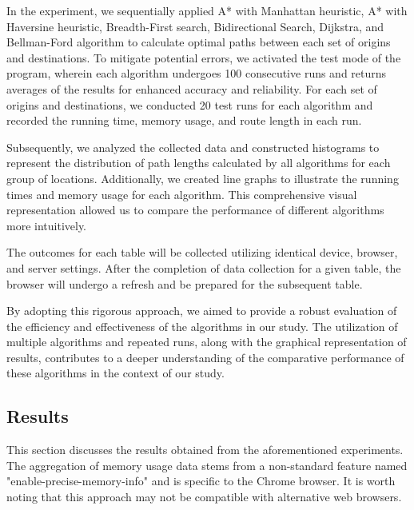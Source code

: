 \documentclass[12pt]{article}
\begin{document}
In the experiment, we sequentially applied A* with Manhattan heuristic, A* with Haversine heuristic, Breadth-First search, Bidirectional Search, Dijkstra, and Bellman-Ford algorithm to calculate optimal paths between each set of origins and destinations. To mitigate potential errors, we activated the test mode of the program, wherein each algorithm undergoes 100 consecutive runs and returns averages of the results for enhanced accuracy and reliability. For each set of origins and destinations, we conducted 20 test runs for each algorithm and recorded the running time, memory usage, and route length in each run.

Subsequently, we analyzed the collected data and constructed histograms to represent the distribution of path lengths calculated by all algorithms for each group of locations. Additionally, we created line graphs to illustrate the running times and memory usage for each algorithm. This comprehensive visual representation allowed us to compare the performance of different algorithms more intuitively.

The outcomes for each table will be collected utilizing identical device, browser, and server settings. After the completion of data collection for a given table, the browser will undergo a refresh and be prepared for the subsequent table.

By adopting this rigorous approach, we aimed to provide a robust evaluation of the efficiency and effectiveness of the algorithms in our study. The utilization of multiple algorithms and repeated runs, along with the graphical representation of results, contributes to a deeper understanding of the comparative performance of these algorithms in the context of our study.


\subsection{Results}

This section discusses the results obtained from the aforementioned experiments. The aggregation of memory usage data stems from a non-standard feature named "enable-precise-memory-info" and is specific to the Chrome browser. It is worth noting that this approach may not be compatible with alternative web browsers.
\end{document}

